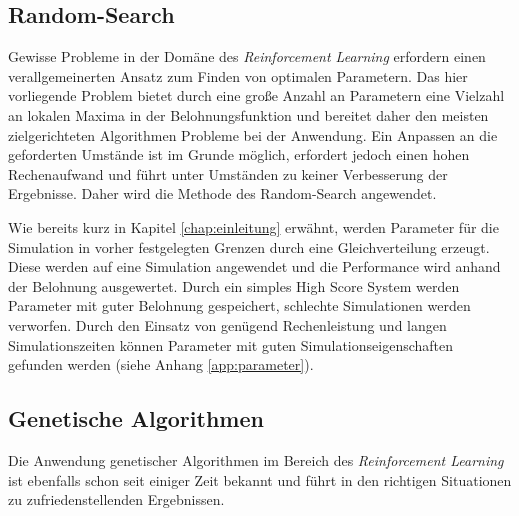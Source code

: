 	\subsection{Random-Search}
	\label{subsec:rl_rs}
		Gewisse Probleme in der Domäne des \textit{Reinforcement Learning} erfordern einen verallgemeinerten Ansatz zum Finden von optimalen Parametern. Das hier vorliegende Problem bietet durch eine große Anzahl an Parametern eine Vielzahl an lokalen Maxima in der Belohnungsfunktion und bereitet daher den meisten zielgerichteten Algorithmen Probleme bei der Anwendung. Ein Anpassen an die geforderten Umstände ist im Grunde möglich, erfordert jedoch einen hohen Rechenaufwand und führt unter Umständen zu keiner Verbesserung der Ergebnisse. Daher wird die Methode des Random-Search angewendet.
		
		Wie bereits kurz in Kapitel \ref{chap:einleitung} erwähnt, werden Parameter für die Simulation in vorher festgelegten Grenzen durch eine Gleichverteilung erzeugt. Diese werden auf eine Simulation angewendet und die Performance wird anhand der Belohnung ausgewertet. Durch ein simples High Score System werden Parameter mit guter Belohnung gespeichert, schlechte Simulationen werden verworfen. Durch den Einsatz von genügend Rechenleistung und langen Simulationszeiten können Parameter mit guten Simulationseigenschaften gefunden werden (siehe Anhang \ref{app:parameter}).
	
	\subsection{Genetische Algorithmen}
	\label{subsec:gen_alg}
		Die Anwendung genetischer Algorithmen im Bereich des \textit{Reinforcement Learning} ist ebenfalls schon seit einiger Zeit bekannt und führt in den richtigen Situationen zu zufriedenstellenden Ergebnissen.
		
